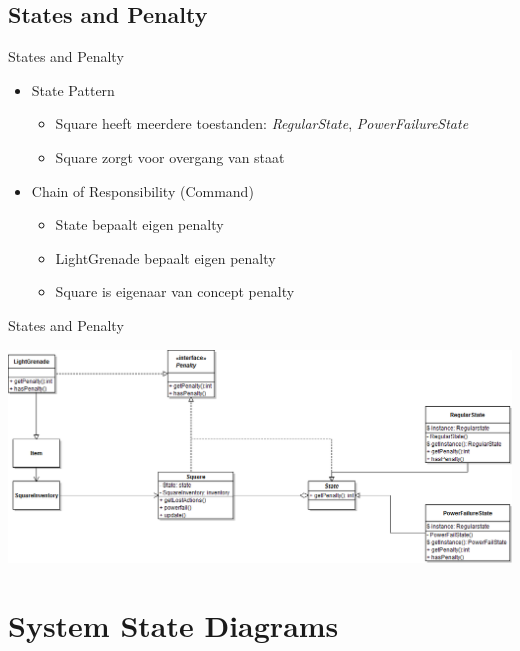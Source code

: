 \documentclass[t]{beamer}
\begin{document}
\subsection{States and Penalty}

\begin{frame}{States and Penalty}
\begin{itemize}
	\item State Pattern
	\begin{itemize}
		\item Square heeft meerdere toestanden: \textit{RegularState}, \textit{PowerFailureState}
		\item Square zorgt voor overgang van staat
	\end{itemize}
	\item Chain of Responsibility (Command)
	\begin{itemize}
		\item State bepaalt eigen penalty
		\item LightGrenade bepaalt eigen penalty
		\item Square is eigenaar van concept penalty
	\end{itemize}
\end{itemize}
\end{frame}

\begin{frame}{States and Penalty}
\begin{center}
\includegraphics[width=0.90\linewidth]{images/classDiagramStateAndPanelty}
\end{center}
\end{frame}


\section{System State Diagrams}
\end{document}
